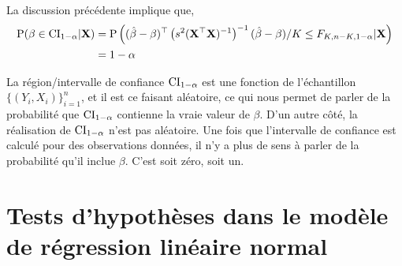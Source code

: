La discussion précédente implique que,
\begin{align*}
\operatorname{P}(\beta \in \mathrm{CI}_{1-\alpha}|\mathbf X) &=\operatorname{P}\left( (\hat{\beta}-\beta)^\top\left(s^2(\mathbf X^\top\mathbf X)^{-1}\right)^{-1}(\hat{\beta}-\beta)/K \leq F_{K, n-K, 1-\alpha} | \mathbf X\right)\\
&=1-\alpha 
\end{align*}
\begin{remarque}
La région/intervalle de confiance $\mathrm{CI}_{1-\alpha}$ est une fonction de l'échantillon $\{(Y_i, X_i)\}_{i=1}^n$, et il est ce faisant aléatoire, ce qui nous permet de parler de la probabilité que $\mathrm{CI}_{1-\alpha}$ contienne la vraie valeur de $\beta$. D'un autre côté, la réalisation de $\mathrm{CI}_{1-\alpha}$ n'est pas aléatoire. Une fois que l'intervalle de confiance est calculé pour des observations données, il n'y a plus de sens à parler de la probabilité qu'il inclue $\beta$. C'est soit zéro, soit un.
\end{remarque}

\newpage

\section{Tests d'hypothèses dans le modèle de régression linéaire normal}

